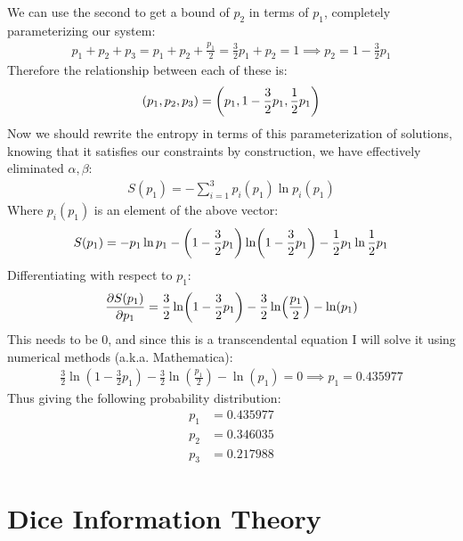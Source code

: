 \documentclass[12pt]{article}
\begin{document}
We can use the second to get a bound of $p_2$ in terms of $p_1$, completely parameterizing our system:
\begin{align*}
  p_1+p_2+p_3=p_1+p_2+\frac{p_1}{2}=\frac32p_1+p_2=1\implies p_2=1-\frac32p_1
\end{align*}
Therefore the relationship between each of these is:
\begin{align*}
  (p_1,p_2,p_3)=\qty(p_1,1-\frac32p_1,\frac12p_1)
\end{align*}
Now we should rewrite the entropy in terms of this parameterization of solutions, knowing that it satisfies our constraints by construction, we have effectively eliminated $\alpha,\beta$:
\begin{align*}
  S(p_1)=-\sum_{i=1}^3p_i(p_1)\ln p_i(p_1)
\end{align*}
Where $p_i(p_1)$ is an element of the above vector:
\begin{align*}
  S(p_1)=-p_1\ln p_1-\qty(1-\frac32p_1)\ln(1-\frac32p_1)-\frac12p_1\ln\frac12p_1
\end{align*}
Differentiating with respect to $p_1$:
\begin{align*}
  \pdv{S(p_1)}{p_1}=\frac32\ln(1-\frac32p_1)-\frac32\ln(\frac{p_1}2)-\ln(p_1)
\end{align*}
This needs to be $0$, and since this is a transcendental equation I will solve it using numerical methods (a.k.a. Mathematica):
\begin{align*}
  \frac32\ln(1-\frac32p_1)-\frac32\ln(\frac{p_1}2)-\ln(p_1)=0\implies
  p_1=0.435977
\end{align*}
Thus giving the following probability distribution:
\begin{equation}
  \boxed{
    \begin{aligned}
      p_1&=0.435977\\
      p_2&=0.346035\\
      p_3&=0.217988
    \end{aligned}
  }
\end{equation}
\section{Dice Information Theory}
\end{document}
